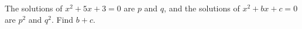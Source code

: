 The solutions of $x^2+5x+3=0$ are $p$ and $q$, and the solutions of $x^2+bx+c=0$ are $p^2$ and $q^2$. Find $b+c$.

